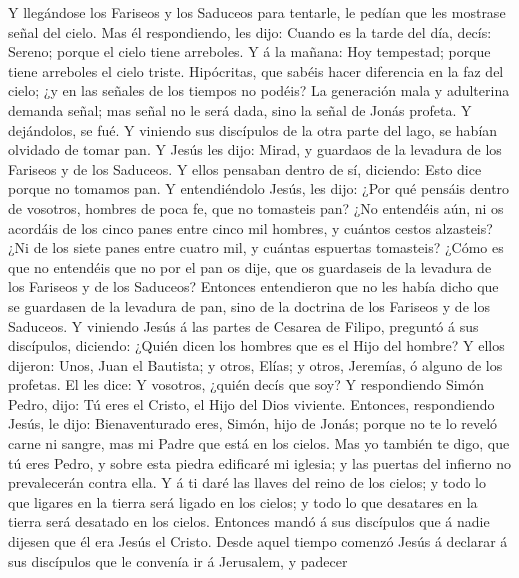  Y llegándose los Fariseos y los Saduceos para tentarle, le
pedían que les mostrase señal del cielo.  Mas él
respondiendo, les dijo: Cuando es la tarde del día, decís: Sereno;
porque el cielo tiene arreboles.  Y á la mañana: Hoy
tempestad; porque tiene arreboles el cielo triste. Hipócritas, que
sabéis hacer diferencia en la faz del cielo; ¿y en las señales de los
tiempos no podéis?  La generación mala y adulterina demanda
señal; mas señal no le será dada, sino la señal de Jonás profeta. Y
dejándolos, se fué.  Y viniendo sus discípulos de la otra
parte del lago, se habían olvidado de tomar pan.  Y Jesús
les dijo: Mirad, y guardaos de la levadura de los Fariseos y de los
Saduceos.  Y ellos pensaban dentro de sí, diciendo: Esto
dice porque no tomamos pan.  Y entendiéndolo Jesús, les
dijo: ¿Por qué pensáis dentro de vosotros, hombres de poca fe, que no
tomasteis pan?  ¿No entendéis aún, ni os acordáis de los
cinco panes entre cinco mil hombres, y cuántos cestos alzasteis?
 ¿Ni de los siete panes entre cuatro mil, y cuántas
espuertas tomasteis?  ¿Cómo es que no entendéis que no por
el pan os dije, que os guardaseis de la levadura de los Fariseos y de
los Saduceos?  Entonces entendieron que no les había dicho
que se guardasen de la levadura de pan, sino de la doctrina de los
Fariseos y de los Saduceos.  Y viniendo Jesús á las partes
de Cesarea de Filipo, preguntó á sus discípulos, diciendo: ¿Quién dicen
los hombres que es el Hijo del hombre?  Y ellos dijeron:
Unos, Juan el Bautista; y otros, Elías; y otros, Jeremías, ó alguno de
los profetas.  El les dice: Y vosotros, ¿quién decís que
soy?  Y respondiendo Simón Pedro, dijo: Tú eres el Cristo,
el Hijo del Dios viviente.  Entonces, respondiendo Jesús,
le dijo: Bienaventurado eres, Simón, hijo de Jonás; porque no te lo
reveló carne ni sangre, mas mi Padre que está en los cielos.
 Mas yo también te digo, que tú eres Pedro, y sobre esta
piedra edificaré mi iglesia; y las puertas del infierno no prevalecerán
contra ella.  Y á ti daré las llaves del reino de los
cielos; y todo lo que ligares en la tierra será ligado en los cielos; y
todo lo que desatares en la tierra será desatado en los cielos.
 Entonces mandó á sus discípulos que á nadie dijesen que él
era Jesús el Cristo.  Desde aquel tiempo comenzó Jesús á
declarar á sus discípulos que le convenía ir á Jerusalem, y padecer
